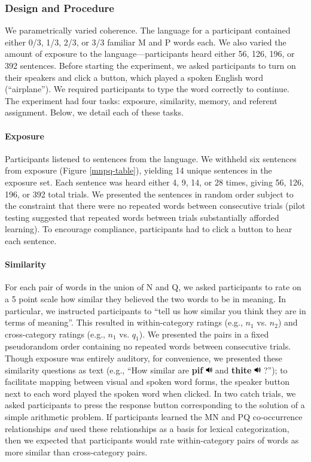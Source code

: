 \documentclass[man,floatsintext]{apa6}
\begin{document}
\subsubsection{Design and Procedure}

We parametrically varied coherence. The language for a participant contained either 0/3, 1/3, 2/3, or 3/3 familiar M and P words each. We also varied the amount of exposure to the language---participants heard either 56, 126, 196, or 392 sentences. Before starting the experiment, we asked participants to turn on their speakers and click a button, which played a spoken English word (``airplane''). We required participants to type the word correctly to continue. The experiment had four tasks: exposure, similarity, memory, and referent assignment. Below, we detail each of these tasks.

\paragraph{Exposure}
Participants listened to sentences from the language. We withheld six sentences from exposure (Figure \ref{mnpq-table}), yielding 14 unique sentences in the exposure set. Each sentence was heard either 4, 9, 14, or 28 times, giving 56, 126, 196, or 392 total trials. We presented the sentences in random order subject to the constraint that there were no repeated words between consecutive trials (pilot testing suggested that repeated words between trials substantially afforded learning). To encourage compliance, participants had to click a button to hear each sentence.

\paragraph{Similarity}
For each pair of words in the union of N and Q, we asked participants to rate on a 5 point scale how similar they believed the two words to be in meaning. In particular, we instructed participants to  ``tell us how similar you think they are in terms of meaning''. This resulted in within-category ratings (e.g., $n_1$ vs. $n_2$) and cross-category ratings (e.g., $n_1$ vs. $q_1$). We presented the pairs in a fixed pseudorandom order containing no repeated words between consecutive trials. Though exposure was entirely auditory, for convenience, we presented these similarity questions as text (e.g., ``How similar are \textbf{pif} \includegraphics[width=0.3cm]{play.png} and \textbf{thite} \includegraphics[width=0.3cm]{play.png} ?''); to facilitate mapping between visual and spoken word forms, the speaker button next to each word played the spoken word when clicked. In two catch trials, we asked participants to press the response button corresponding to the solution of a simple arithmetic problem. If participants learned the MN and PQ co-occurrence relationships \emph{and} used these relationships as a basis for lexical categorization, then we expected that participants would rate within-category pairs of words as more similar than cross-category pairs.
\end{document}
